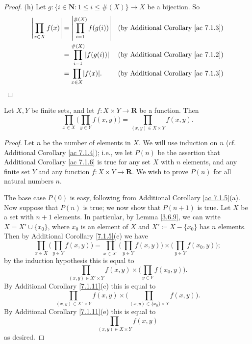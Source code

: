 \begin{proof}{(h)}
Let \(g : \{i \in \mathbf{N} : 1 \leq i \leq \#(X)\} \to X\) be a bijection.
So
\begin{align*}
\abs*{\prod_{x \in X} f(x)} &= \abs*{\prod_{i = 1}^{\#(X)} f(g(i))} & \text{(by Additional Corollary \ref{ac 7.1.3})} \\
&= \prod_{i = 1}^{\#(X)} \abs*{f(g(i))} & \text{(by Additional Corollary \ref{ac 7.1.2})} \\
&= \prod_{x \in X} \abs*{f(x)}. & \text{(by Additional Corollary \ref{ac 7.1.3})}
\end{align*}
\end{proof}

\begin{additional corollary}\label{ac 7.1.6}
Let \(X, Y\) be finite sets, and let \(f : X \times Y \to \mathbf{R}\) be a function.
Then
\[
    \prod_{x \in X} \bigg(\prod_{y \in Y} f(x, y)\bigg) = \prod_{(x, y) \in X \times Y} f(x, y).
\]
\end{additional corollary}

\begin{proof}
Let \(n\) be the number of elements in \(X\).
We will use induction on \(n\) (cf. Additional Corollary \ref{ac 7.1.4});
i.e., we let \(P(n)\) be the assertion that Additional Corollary \ref{ac 7.1.6} is true for any set \(X\) with \(n\) elements, and any finite set \(Y\) and any function \(f : X \times Y \to \mathbf{R}\).
We wish to prove \(P(n)\) for all natural numbers \(n\).

The base case \(P(0)\) is easy, following from Additional Corollary \ref{ac 7.1.5}(a).
Now suppose that \(P(n)\) is true;
we now show that \(P(n + 1)\) is true.
Let \(X\) be a set with \(n + 1\) elements.
In particular, by Lemma \ref{3.6.9}, we can write \(X = X' \cup \{x_0\}\), where \(x_0\) is an element of \(X\) and \(X' \coloneqq X - \{x_0\}\) has \(n\) elements.
Then by Additional Corollary \ref{7.1.5}(e) we have
\[
    \prod_{x \in X} \bigg(\prod_{y \in Y} f(x, y)\bigg) = \prod_{x \in X'} \bigg(\prod_{y \in Y} f(x, y)\bigg) \times \bigg(\prod_{y \in Y} f(x_0, y)\bigg);
\]
by the induction hypothesis this is equal to
\[
    \prod_{(x, y) \in X' \times Y} f(x, y) \times \bigg(\prod_{y \in Y} f(x_0, y)\bigg).
\]
By Additional Corollary \ref{7.1.11}(c) this is equal to
\[
    \prod_{(x, y) \in X' \times Y} f(x, y) \times \bigg(\prod_{(x, y) \in \{x_0\} \times Y} f(x, y)\bigg).
\]
By Additional Corollary \ref{7.1.11}(e) this is equal to
\[
    \prod_{(x, y) \in X \times Y} f(x, y)
\]
as desired.
\end{proof}

